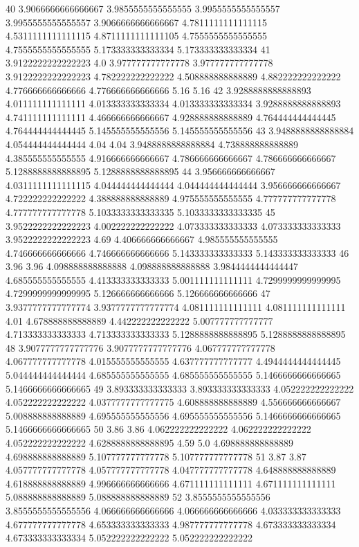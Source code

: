 40 3.9066666666666667 3.9855555555555555 3.9955555555555557 3.9955555555555557 3.9066666666666667 4.7811111111111115 4.5311111111111115 4.8711111111111105 4.7555555555555555 4.7555555555555555 5.173333333333334 5.173333333333334
41 3.9122222222222223 4.0 3.977777777777778 3.977777777777778 3.9122222222222223 4.782222222222222 4.508888888888889 4.882222222222222 4.776666666666666 4.776666666666666 5.16 5.16
42 3.9288888888888893 4.011111111111111 4.013333333333334 4.013333333333334 3.9288888888888893 4.741111111111111 4.466666666666667 4.928888888888889 4.764444444444445 4.764444444444445 5.145555555555556 5.145555555555556
43 3.9488888888888884 4.054444444444444 4.04 4.04 3.9488888888888884 4.738888888888889 4.385555555555555 4.916666666666667 4.786666666666667 4.786666666666667 5.1288888888888895 5.1288888888888895
44 3.956666666666667 4.0311111111111115 4.044444444444444 4.044444444444444 3.956666666666667 4.722222222222222 4.388888888888889 4.975555555555555 4.777777777777778 4.777777777777778 5.1033333333333335 5.1033333333333335
45 3.9522222222222223 4.002222222222222 4.073333333333333 4.073333333333333 3.9522222222222223 4.69 4.406666666666667 4.985555555555555 4.746666666666666 4.746666666666666 5.143333333333333 5.143333333333333
46 3.96 3.96 4.098888888888888 4.098888888888888 3.9844444444444447 4.685555555555555 4.413333333333333 5.001111111111111 4.7299999999999995 4.7299999999999995 5.126666666666666 5.126666666666666
47 3.9377777777777774 3.9377777777777774 4.081111111111111 4.081111111111111 4.01 4.678888888888889 4.442222222222222 5.007777777777777 4.713333333333333 4.713333333333333 5.1288888888888895 5.1288888888888895
48 3.9077777777777776 3.9077777777777776 4.067777777777778 4.067777777777778 4.015555555555555 4.637777777777777 4.4944444444444445 5.044444444444444 4.685555555555555 4.685555555555555 5.1466666666666665 5.1466666666666665
49 3.893333333333333 3.893333333333333 4.052222222222222 4.052222222222222 4.0377777777777775 4.608888888888889 4.556666666666667 5.008888888888889 4.695555555555556 4.695555555555556 5.1466666666666665 5.1466666666666665
50 3.86 3.86 4.062222222222222 4.062222222222222 4.052222222222222 4.6288888888888895 4.59 5.0 4.698888888888889 4.698888888888889 5.107777777777778 5.107777777777778
51 3.87 3.87 4.057777777777778 4.057777777777778 4.047777777777778 4.648888888888889 4.618888888888889 4.996666666666666 4.671111111111111 4.671111111111111 5.088888888888889 5.088888888888889
52 3.8555555555555556 3.8555555555555556 4.066666666666666 4.066666666666666 4.033333333333333 4.677777777777778 4.653333333333333 4.987777777777778 4.673333333333334 4.673333333333334 5.052222222222222 5.052222222222222
